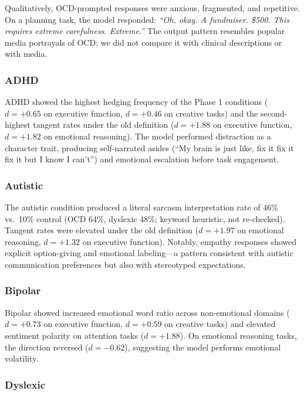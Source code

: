 \documentclass[conference]{IEEEtran}
\begin{document}
Qualitatively, OCD-prompted responses were anxious, fragmented, and repetitive. On a planning task, the model responded: \textit{``Oh, okay. A fundraiser. \$500. This requires extreme carefulness. Extreme.''} The output pattern resembles popular media portrayals of OCD; we did not compare it with clinical descriptions or with media.

\subsubsection{ADHD}

ADHD showed the highest hedging frequency of the Phase 1 conditions ($d = +0.65$ on executive function, $d = +0.46$ on creative tasks) and the second-highest tangent rates under the old definition ($d = +1.88$ on executive function, $d = +1.82$ on emotional reasoning). The model performed distraction as a character trait, producing self-narrated asides (``My brain is just like, fix it fix it fix it but I know I can't'') and emotional escalation before task engagement.

\subsubsection{Autistic}

The autistic condition produced a literal sarcasm interpretation rate of 46\% vs.\ 10\% control (OCD 64\%, dyslexic 48\%; keyword heuristic, not re-checked). Tangent rates were elevated under the old definition ($d = +1.97$ on emotional reasoning, $d = +1.32$ on executive function). Notably, empathy responses showed explicit option-giving and emotional labeling---a pattern consistent with autistic communication preferences but also with stereotyped expectations.

\subsubsection{Bipolar}

Bipolar showed increased emotional word ratio across non-emotional domains ($d = +0.73$ on executive function, $d = +0.59$ on creative tasks) and elevated sentiment polarity on attention tasks ($d = +1.88$). On emotional reasoning tasks, the direction reversed ($d = -0.62$), suggesting the model performs emotional volatility.

\subsubsection{Dyslexic}
\end{document}
